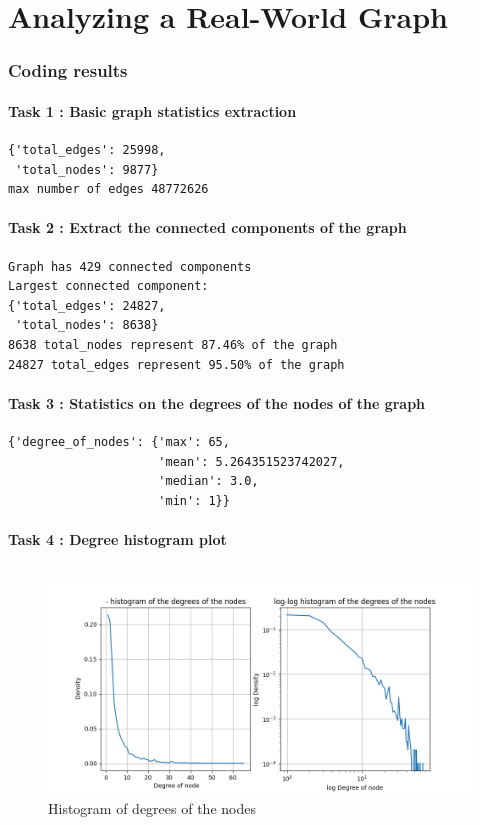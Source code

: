 \documentclass[a4paper]{article}
\begin{document}


\part[short]{Analyzing a Real-World Graph}

\section*{Coding results}

\subsection*{Task 1 : Basic graph statistics extraction}
\begin{verbatim}
{'total_edges': 25998,
 'total_nodes': 9877}
max number of edges 48772626
\end{verbatim}


\subsection*{Task 2 : Extract the connected components of the graph}
\begin{verbatim}
Graph has 429 connected components
Largest connected component:
{'total_edges': 24827,
 'total_nodes': 8638}
8638 total_nodes represent 87.46% of the graph
24827 total_edges represent 95.50% of the graph
\end{verbatim}


\subsection*{Task 3 : Statistics on the degrees of the nodes of the graph}
\begin{verbatim}
{'degree_of_nodes': {'max': 65,
                     'mean': 5.264351523742027,
                     'median': 3.0,
                     'min': 1}}
\end{verbatim}


\subsection*{Task 4 : Degree histogram plot}
\begin{verbatim}
\end{verbatim}\begin{figure}[ht]
        \centering
        \includegraphics[width=.6\textwidth]{figures/histogram_degree_of_nodes.png}
        \caption{Histogram of degrees of the nodes}
\end{figure}
\begin{verbatim}
\end{verbatim}
\end{document}
